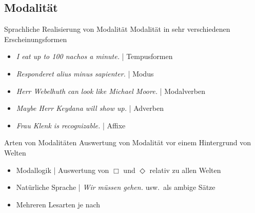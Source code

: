 \subsection{Modalität}

\begin{frame}
  {Sprachliche Realisierung von Modalität}
  \onslide<+->
  \onslide<+->
  Modalität in sehr verschiedenen Erscheinungsformen\\
  \Halbzeile
  \begin{itemize}[<+->]
    \item \textit{I \alert{eat up to} 100 nachos a minute.} | \alert{Tempusformen}
    \item \textit{\alert{Responderet} alius minus sapienter.} | \alert{Modus}
    \item \textit{Herr Webelhuth \alert{can} look like Michael Moore.} | \alert{Modalverben}
    \item \textit{\alert{Maybe} Herr Keydana will show up.} | \alert{Adverben}
    \item \textit{Frau Klenk is recogniz\alert{able}.} | \alert{Affixe}
  \end{itemize}
\end{frame}

\begin{frame}
  {Arten von Modalitäten}
  \onslide<+->
  \onslide<+->
  Auswertung von Modalität vor einem \alert{Hintergrund von Welten}
  \Halbzeile
  \begin{itemize}[<+->]
    \item Modallogik | Auswertung von $\Box$ und $\Diamond$ relativ zu \alert{allen Welten}\\
      \Halbzeile
    \item Natürliche Sprache | \textit{Wir müssen gehen.} usw.\ als \alert{ambige Sätze}
    \item \alert{Mehreren Lesarten} je nach 
  \end{itemize}
\end{frame}

